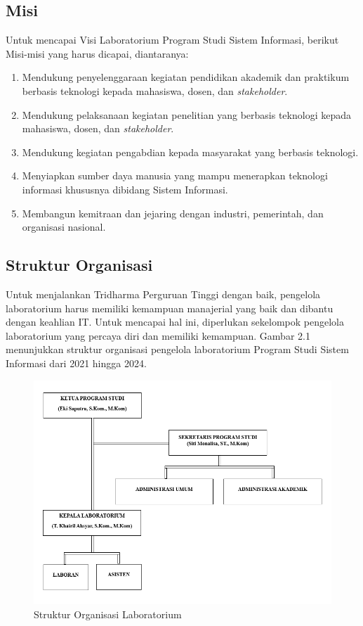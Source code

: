 \subsection{Misi}
Untuk mencapai Visi Laboratorium Program Studi Sistem Informasi, berikut Misi-misi yang harus dicapai, diantaranya:

\begin{enumerate}

	\item Mendukung penyelenggaraan kegiatan pendidikan akademik dan praktikum berbasis teknologi kepada mahasiswa, dosen, dan \textit{stakeholder}.
	\item Mendukung pelaksanaan kegiatan penelitian yang berbasis teknologi kepada mahasiswa, dosen, dan \textit{stakeholder}.
	\item Mendukung kegiatan pengabdian kepada masyarakat yang berbasis teknologi.
	\item Menyiapkan sumber daya manusia yang mampu menerapkan teknologi informasi khususnya dibidang Sistem Informasi.
	\item Membangun kemitraan dan jejaring dengan industri, pemerintah, dan organisasi nasional.

\end{enumerate}
\subsection{Struktur Organisasi}
Untuk menjalankan Tridharma Perguruan Tinggi dengan baik, pengelola laboratorium harus memiliki kemampuan manajerial yang baik dan dibantu dengan keahlian IT. Untuk mencapai hal ini, diperlukan sekelompok pengelola laboratorium yang percaya diri dan memiliki kemampuan. Gambar 2.1 menunjukkan struktur organisasi pengelola laboratorium Program Studi Sistem Informasi dari 2021 hingga 2024.

\begin{figure}
	\centering
	\includegraphics[width=0.82\linewidth]{konten/gambar/Struktur Organisasi.png}
	\caption{Struktur Organisasi Laboratorium \protect\cite{labsi2023}}
	\label{fig:struktur-organisasi}
\end{figure}

